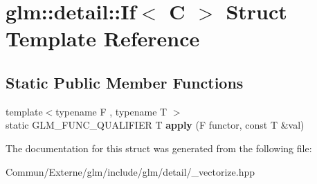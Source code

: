 \hypertarget{structglm_1_1detail_1_1_if}{}\section{glm\+:\+:detail\+:\+:If$<$ C $>$ Struct Template Reference}
\label{structglm_1_1detail_1_1_if}
\subsection*{Static Public Member Functions}
\begin{DoxyCompactItemize}
\item 
{\footnotesize template$<$typename F , typename T $>$ }\\static G\+L\+M\+\_\+\+F\+U\+N\+C\+\_\+\+Q\+U\+A\+L\+I\+F\+I\+ER T {\bfseries apply} (F functor, const T \&val)\hypertarget{structglm_1_1detail_1_1_if_ab66c77bac87f7ffe4aa6bb761b165746}{}\label{structglm_1_1detail_1_1_if_ab66c77bac87f7ffe4aa6bb761b165746}

\end{DoxyCompactItemize}


The documentation for this struct was generated from the following file\+:\begin{DoxyCompactItemize}
\item 
Commun/\+Externe/glm/include/glm/detail/\+\_\+vectorize.\+hpp\end{DoxyCompactItemize}
